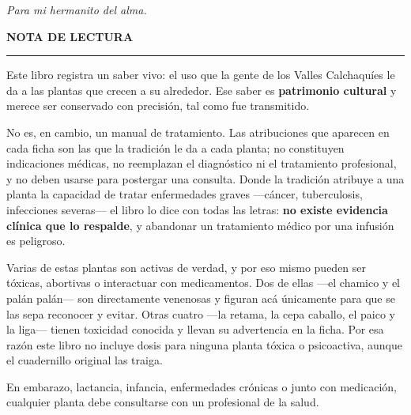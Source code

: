 \documentclass[11pt,twoside,openright]{book}
\makeatletter
\def\cleardoublepage{\clearpage\if@twoside\ifodd\c@page\else
  \hbox{}\thispagestyle{empty}\newpage\if@twocolumn\hbox{}\newpage\fi\fi\fi}
\makeatother
\begin{document}
\cleardoublepage
\null\vspace*{7cm}
\begin{flushright}
  \begin{minipage}{0.68\textwidth}
    \raggedleft\itshape\color{verdehuerta}
    Para mi hermanito del alma.
  \end{minipage}
\end{flushright}
\clearpage

\cleardoublepage
\null\vspace*{1.2cm}
\begin{center}
  {\sffamily\bfseries\color{verdehuerta} NOTA DE LECTURA}\\[0.4em]
  {\color{verdehoja}\rule{4cm}{0.8pt}}
\end{center}
\vspace{1.2em}
\noindent\small
Este libro registra un saber vivo: el uso que la gente de los Valles
Calchaquíes le da a las plantas que crecen a su alrededor. Ese saber es
\textbf{patrimonio cultural} y merece ser conservado con precisión, tal
como fue transmitido.

\vspace{0.7em}
\noindent\small
No es, en cambio, un manual de tratamiento. Las atribuciones que
aparecen en cada ficha son las que la tradición le da a cada planta; no
constituyen indicaciones médicas, no reemplazan el diagnóstico ni el
tratamiento profesional, y no deben usarse para postergar una consulta.
Donde la tradición atribuye a una planta la capacidad de tratar
enfermedades graves —cáncer, tuberculosis, infecciones severas— el libro
lo dice con todas las letras: \textbf{no existe evidencia clínica que lo
respalde}, y abandonar un tratamiento médico por una infusión es
peligroso.

\vspace{0.7em}
\noindent\small
Varias de estas plantas son activas de verdad, y por eso mismo pueden
ser tóxicas, abortivas o interactuar con medicamentos. Dos de ellas
—el chamico y el palán palán— son directamente venenosas y figuran acá
únicamente para que se las sepa reconocer y evitar. Otras cuatro —la
retama, la cepa caballo, el paico y la liga— tienen toxicidad conocida y llevan
su advertencia en la ficha. Por esa razón este libro no incluye dosis
para ninguna planta tóxica o psicoactiva, aunque el cuadernillo original
las traiga.

\vspace{0.7em}
\noindent\small
En embarazo, lactancia, infancia, enfermedades crónicas o junto con
medicación, cualquier planta debe consultarse con un profesional de la
salud.
\end{document}
